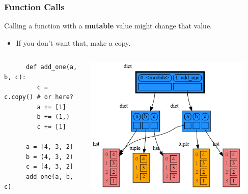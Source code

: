 \documentclass[10pt, colorlinks=true, urlcolor=blue]{beamer}
\begin{document}
\begin{frame}[fragile]
\frametitle{Function Calls}
  Calling a function with a \textbf{mutable} value might change that value.
  \begin{itemize}
  \item If you don't want that, make a copy.
  \end{itemize}

  \begin{columns}
    \begin{verbatim}
      def add_one(a, b, c):
         c = c.copy() # or here?
         a += [1]
         b += (1,)
         c += [1]
         
      a = [4, 3, 2]
      b = (4, 3, 2)
      c = [4, 3, 2]
      add_one(a, b, c)
    \end{verbatim}
    \begin{center}\includegraphics[width=0.9\textwidth]{figures/function_call.png}\end{center}
  \end{columns}
\end{frame}
\end{document}
